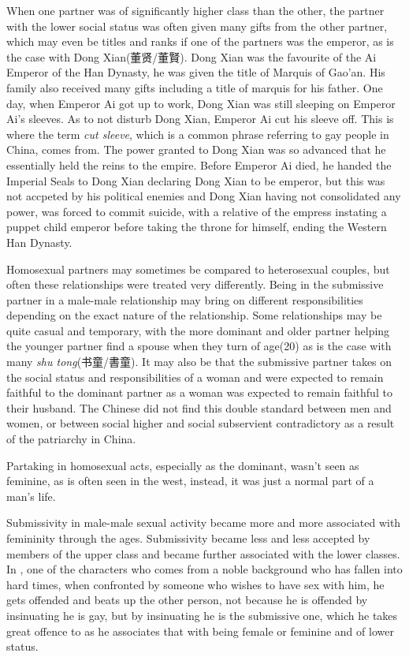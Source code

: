 When one partner was of significantly higher class than the other, the partner with the lower social status was often given many gifts from the other partner\Autocite{hinsch1990passions}, which may even be titles and ranks if one of the partners was the emperor, as is the case with Dong Xian(董贤/董賢). Dong Xian was the favourite of the Ai Emperor of the Han Dynasty, he was given the title of Marquis of Gao'an. His family also received many gifts including a title of marquis for his father. One day, when Emperor Ai got up to work, Dong Xian was still sleeping on Emperor Ai's sleeves. As to not disturb Dong Xian, Emperor Ai cut his sleeve off. This is where the term \textit{cut sleeve}, which is a common phrase referring to gay people in China, comes from. The power granted to Dong Xian was so advanced that he essentially held the reins to the empire. Before Emperor Ai died, he handed the Imperial Seals to Dong Xian declaring Dong Xian to be emperor, but this was not accpeted by his political enemies and Dong Xian having not consolidated any power, was forced to commit suicide, with a relative of the empress instating a puppet child emperor before taking the throne for himself, ending the Western Han Dynasty.

Homosexual partners may sometimes be compared to heterosexual couples\Autocite{hinsch1990passions}, but often these relationships were treated very differently. Being in the submissive partner in a male-male relationship may bring on different responsibilities depending on the exact nature of the relationship. Some relationships may be quite casual and temporary, with the more dominant and older partner helping the younger partner find a spouse when they turn of age(20) as is the case with many \textit{shu tong}(书童/書童). It may also be that the submissive partner takes on the social status and responsibilities of a woman and were expected to remain faithful to the dominant partner as a woman was expected to remain faithful to their husband. The Chinese did not find this double standard between men and women, or between social higher and social subservient contradictory as a result of the patriarchy in China.

Partaking in homosexual acts, especially as the dominant, wasn't seen as feminine, as is often seen in the west, instead, it was just a normal part of a man's life.

Submissivity in male-male sexual activity became more and more associated with femininity through the ages\Autocite{hinsch1990passions}. Submissivity became less and less accepted by members of the upper class and became further associated with the lower classes. In , one of the characters who comes from a noble background who has fallen into hard times, when confronted by someone who wishes to have sex with him, he gets offended and beats up the other person, not because he is offended by insinuating he is gay, but by insinuating he is the submissive one, which he takes great offence to as he associates that with being female or feminine and of lower status.

